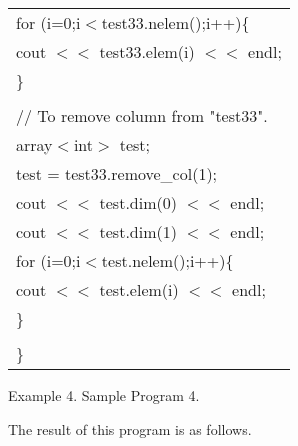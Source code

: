 {\begin{center}
\begin{tabular}{|l|}
\hspace*{10mm}for (i=0;i$<$test33.nelem();i++)\{\\
\hspace*{20mm}cout $<<$ test33.elem(i) $<<$ endl;\\
\hspace*{10mm}\}\\
\\
\hspace*{10mm}// To remove column from "test33".\\
\hspace*{10mm}array$<$int$>$ test;\\
\hspace*{10mm}test = test33.remove\_col(1);\\
\hspace*{10mm}cout $<<$ test.dim(0) $<<$ endl;\\
\hspace*{10mm}cout $<<$ test.dim(1) $<<$ endl;\\
\hspace*{10mm}for (i=0;i$<$test.nelem();i++)\{\\
\hspace*{20mm}cout $<<$ test.elem(i) $<<$ endl;\\
\hspace*{10mm}\}\\
\\
\}\\\hline
\end{tabular}
\vspace*{5mm}

Example 4. Sample Program 4.
\end{center}
}

\clearpage

\noindent
The result of this program is as follows.

